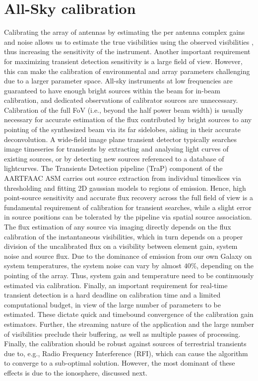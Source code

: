 \documentclass{aa}
\begin{document}
\section{\label{sec:Array-calibration-for}All-Sky calibration}
Calibrating the  array of antennas by  estimating the per  antenna complex gains
and  noise  allows us  to  estimate the  true  visibilities  using the  observed
visibilities \citep{taylor1999synthesis}, thus increasing the sensitivity of the
instrument.   Another important requirement  for maximizing  transient detection
sensitivity is a large field of  view. However, this can make the calibration of
environmental and array parameters challenging  due to a larger parameter space.
All-sky  instruments at  low frequencies  are guaranteed  to have  enough bright
sources within the  beam for in-beam calibration, and  dedicated observations of
calibrator sources are  unnecessary.  Calibration of the full  FoV (i.e., beyond
the half power  beam width) is usually necessary for  accurate estimation of the
flux contributed by  bright sources to any pointing of  the synthesized beam via
its far sidelobes, aiding in their accurate deconvolution.
A wide-field image plane  transient detector typically searches image timeseries
for transients by extracting and  analysing light curves of existing sources, or
by  detecting  new  sources  referenced  to  a  database  of  lightcurves.   The
Transients Detection  pipeline (TraP) \citep{swinbank2013trap}  component of the
AARTFAAC  ASM  carries out  source  extraction  from  individual timeslices  via
thresholding and fitting 2D gaussian  models to regions of emission. Hence, high
point-source sensitivity  and accurate  flux recovery across  the full  field of
view is a fundamental requirement of calibration for transient searches, while a
slight error  in source positions can  be tolerated by the  pipeline via spatial
source  association.  The  flux estimation  of any  source via  imaging directly
depends on the flux calibration of the instantaneous visibilities, which in turn
depends on  a proper division of  the uncalibrated flux on  a visibility between
element gain,  system noise and source  flux.  Due to the  dominance of emission
from our own Galaxy on system  temperatures, the system noise can vary by almost
$40\%$,  depending  on  the  pointing  of  the array.   Thus,  system  gain  and
temperature need to be continuously estimated via calibration.
Finally, an  important requirement for  real-time transient detection is  a hard
deadline on calibration time and a  limited computational budget, in view of the
large number of  parameters to be estimated.  These  dictate quick and timebound
convergence of  the calibration gain estimators.  Further,  the streaming nature
of  the  application  and  the  large  number  of  visibilities  preclude  their
buffering, as  well as multiple  passes of processing. Finally,  the calibration
should be robust  against sources of terrestrial transients  due to, e.g., Radio
Frequency Interference  (RFI), which  can cause the  algorithm to converge  to a
sub-optimal solution. However, the most dominant  of these effects is due to the
ionosphere, discussed next.
\end{document}
